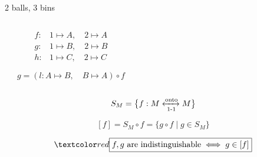 \begin{frame}{}
  \begin{center}
    2 balls, 3 bins \qquad {}
  \end{center}

  \begin{columns}
    \pause
      \begin{center}
      \end{center}
      \begin{center}
        \pause
        \pause
        \begin{align*}
          f: & 1 \mapsto A, \quad 2 \mapsto A \\[5pt]
          g: & 1 \mapsto B, \quad 2 \mapsto B \\[5pt]
          h: & 1 \mapsto C, \quad 2 \mapsto C
        \end{align*}

        \pause
        \[
          g = (l: A \mapsto B, \quad B \mapsto A) \circ f
        \]
      \end{center}
  \end{columns}
\end{frame}

\begin{frame}{}
  

  \pause
  \[
    S_M = \big\{ f: M \xleftrightarrow[\text{1-1}]{\text{onto}} M \big\}
  \]

  \pause
  \[
    [f] = S_M \circ f = \big\{g \circ f \mid g \in S_M \big\}
  \]

  \pause
  \[
    \red{\boxed{f, g \text{ are indistinguishable} \iff g \in [f]}}
  \]
\end{frame}

